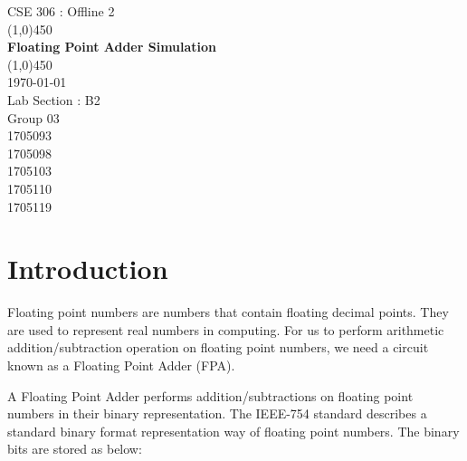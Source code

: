\documentclass[12pt, a4paper]{article}
\begin{document}
	\begin{titlepage}
		\begin{center}
			\vspace*{1cm}
			\LARGE{CSE 306 : Offline 2\\}
			\vspace*{2cm}
			\line(1,0){450}\\
			\vspace*{1cm}
			\Huge{\textbf{\centering Floating Point Adder Simulation\\}}
			\vspace*{1cm}
			\line(1,0){450}\\
			\vspace*{1.5cm}
			\today\\
			\vspace*{1.5cm}
			\Large{Lab Section : B2\\
				Group 03 \\
				\vspace*{1cm}
				1705093\\
				1705098\\
				1705103\\
				1705110\\
				1705119\\}
		\end{center}
	\end{titlepage}
	\section{Introduction}
	Floating point numbers are numbers that contain floating decimal points.
	They are used to represent real numbers in computing. For us to perform
	arithmetic addition/subtraction operation on floating point numbers, we
	need a circuit known as a Floating Point Adder (FPA).

	A Floating Point Adder performs addition/subtractions on floating point
	numbers in their binary representation. The IEEE-754 standard describes a
	standard binary format representation way of floating point numbers. The
	binary bits are stored as below:
	\vspace*{0.75cm}
	\begin{table}[h]
		\begin{center}
		\end{center}
	\end{table}
\end{document}

